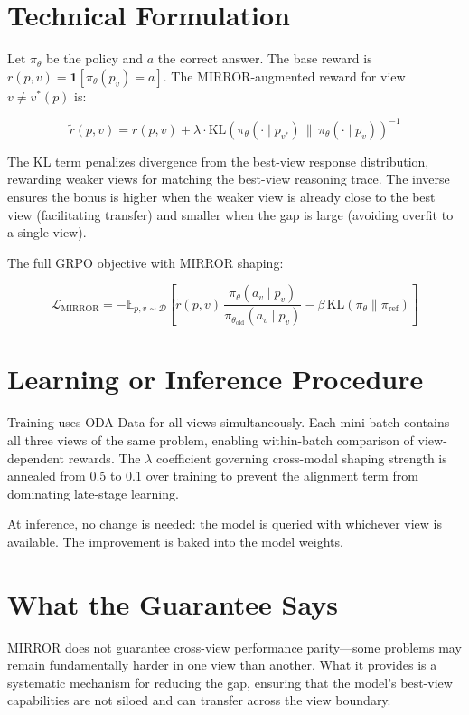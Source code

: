 \documentclass[10pt,twocolumn]{article}
\begin{document}
\section{Technical Formulation}

Let $\pi_\theta$ be the policy and $a$ the correct answer.
The base reward is $r(p, v) = \mathbf{1}[\pi_\theta(p_v) = a]$.
The MIRROR-augmented reward for view $v \neq v^*(p)$ is:

\[
  \tilde{r}(p, v) = r(p, v) + \lambda
    \cdot \mathrm{KL}\!\left(\pi_\theta(\cdot \mid p_{v^*})\,
    \Big\|\, \pi_\theta(\cdot \mid p_v)\right)^{-1}
\]

The KL term penalizes divergence from the best-view response
distribution, rewarding weaker views for matching the best-view
reasoning trace. The inverse ensures the bonus is higher when the
weaker view is already close to the best view (facilitating transfer)
and smaller when the gap is large (avoiding overfit to a single view).

The full GRPO objective with MIRROR shaping:

\[
  \mathcal{L}_\text{MIRROR} = -\mathbb{E}_{p, v \sim \mathcal{D}}
    \left[\tilde{r}(p, v)\,
    \frac{\pi_\theta(a_v \mid p_v)}{\pi_{\theta_\text{old}}(a_v \mid p_v)}
    - \beta\,\mathrm{KL}(\pi_\theta \| \pi_\text{ref})\right]
\]

\section{Learning or Inference Procedure}

Training uses ODA-Data for all views simultaneously. Each mini-batch
contains all three views of the same problem, enabling within-batch
comparison of view-dependent rewards. The $\lambda$ coefficient
governing cross-modal shaping strength is annealed from 0.5 to 0.1
over training to prevent the alignment term from dominating late-stage
learning.

At inference, no change is needed: the model is queried with whichever
view is available. The improvement is baked into the model weights.

\section{What the Guarantee Says}

MIRROR does not guarantee cross-view performance parity---some problems
may remain fundamentally harder in one view than another. What it
provides is a systematic mechanism for reducing the gap, ensuring that
the model's best-view capabilities are not siloed and can transfer
across the view boundary.
\end{document}
